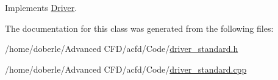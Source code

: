 Implements \hyperlink{class_driver_a1cebfd199c4b9dac845235479e3b485b}{Driver}.



The documentation for this class was generated from the following files\+:\begin{DoxyCompactItemize}
\item 
/home/doberle/\+Advanced C\+F\+D/acfd/\+Code/\hyperlink{driver__standard_8h}{driver\+\_\+standard.\+h}\item 
/home/doberle/\+Advanced C\+F\+D/acfd/\+Code/\hyperlink{driver__standard_8cpp}{driver\+\_\+standard.\+cpp}\end{DoxyCompactItemize}
